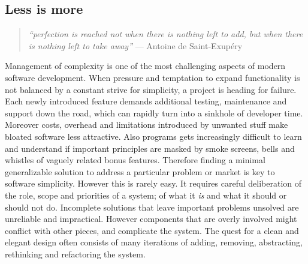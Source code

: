 \subsection{Less is more}

\begin{quote}
\emph{``perfection is reached not when there is nothing left to add, but when there is nothing left to take away''} --- Antoine de Saint-Exupéry
\end{quote}

\vspace{8pt}


\noindent Management of complexity is one of the most challenging aspects of modern software development. When pressure and temptation to expand functionality is not balanced by a constant strive for simplicity, a project is heading for failure. Each newly introduced feature demands additional testing, maintenance and support down the road, which can rapidly turn into a sinkhole of developer time. Moreover costs, overhead and limitations introduced by unwanted stuff make bloated software less attractive. Also programs gets increasingly difficult to learn and understand if important principles are masked by smoke screens, bells and whistles of vaguely related bonus features. Therefore finding a minimal generalizable solution to address a particular problem or market is key to software simplicity. However this is rarely easy. It requires careful deliberation of the role, scope and priorities of a system; of what it \emph{is} and what it should or should not do. Incomplete solutions that leave important problems unsolved are unreliable and impractical. However components that are overly involved might conflict with other pieces, and complicate the system. The quest for a clean and elegant design often consists of many iterations of adding, removing, abstracting, rethinking and refactoring the system.

